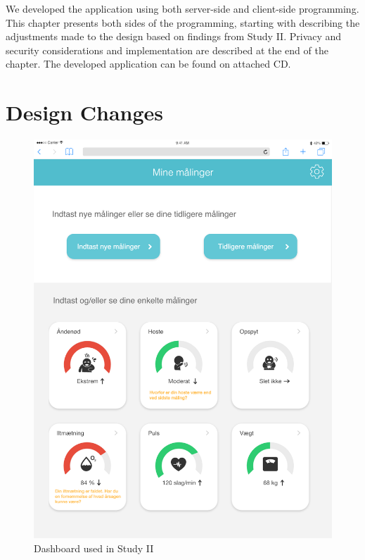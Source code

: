 We developed the application using both server-side and client-side programming. This chapter presents both sides of the programming, starting with describing the adjustments made to the design based on findings from Study II. Privacy and security considerations and implementation are described at the end of the chapter. The developed application can be found on attached CD.

\section{Design Changes}

\begin{figure}[h]
  \centering
  \begin{minipage}[b]{0.45\textwidth}
    \includegraphics[width=\textwidth]{images/study2/Dashboard.png}
    \caption{Dashboard used in Study II}
    \label{fig:db1st}
  \end{minipage}
  \hfill
  \begin{minipage}[b]{0.45\textwidth}

\end{minipage}
\end{figure}
